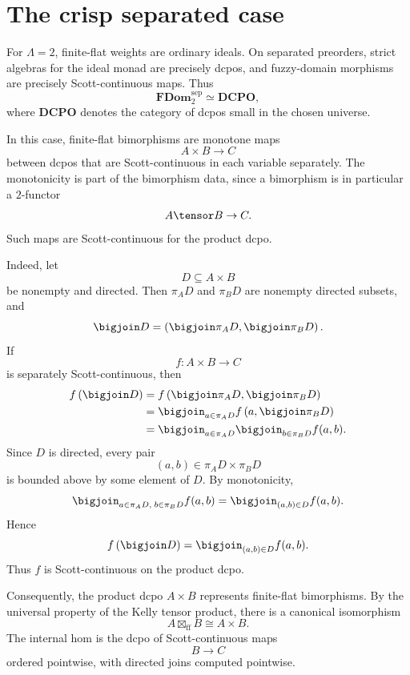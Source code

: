 \section{The crisp separated case}
\label{sec:crisp-separated-case-fdom-rewrite}

For \(\Lambda=2\), finite-flat weights are ordinary ideals.  On separated
preorders, strict algebras for the ideal monad are precisely dcpos, and
fuzzy-domain morphisms are precisely Scott-continuous maps.  Thus
\[
    \mathbf{FDom}_{2}^{\mathrm{sep}}
    \simeq
    \mathbf{DCPO},
\]
where \(\mathbf{DCPO}\) denotes the category of dcpos small in the chosen
universe.

In this case, finite-flat bimorphisms are monotone maps
\[
    A\times B\to C
\]
between dcpos that are Scott-continuous in each variable separately.  The
monotonicity is part of the bimorphism data, since a bimorphism is in particular
a \(2\)-functor
\[
    A\tensor B\to C.
\]
Such maps are Scott-continuous for the product dcpo.

Indeed, let
\[
    D\subseteq A\times B
\]
be nonempty and directed.  Then \(\pi_A D\) and \(\pi_BD\) are nonempty directed
subsets, and
\[
    \bigjoin D
    =
    \left(
        \bigjoin\pi_A D,
        \bigjoin\pi_BD
    \right).
\]
If
\[
    f:A\times B\to C
\]
is separately Scott-continuous, then
\[
\begin{aligned}
    f\left(\bigjoin D\right)
    &=
    f\left(
        \bigjoin\pi_A D,
        \bigjoin\pi_B D
    \right)
    \\
    &=
    \bigjoin_{a\in\pi_A D}
        f\left(a,\bigjoin\pi_BD\right)
    \\
    &=
    \bigjoin_{a\in\pi_A D}
        \bigjoin_{b\in\pi_BD}
            f(a,b).
\end{aligned}
\]
Since \(D\) is directed, every pair
\[
    (a,b)\in\pi_A D\times\pi_BD
\]
is bounded above by some element of \(D\).  By monotonicity,
\[
    \bigjoin_{a\in\pi_A D,\;b\in\pi_BD}f(a,b)
    =
    \bigjoin_{(a,b)\in D}f(a,b).
\]
Hence
\[
    f\left(\bigjoin D\right)
    =
    \bigjoin_{(a,b)\in D}f(a,b).
\]
Thus \(f\) is Scott-continuous on the product dcpo.

Consequently, the product dcpo \(A\times B\) represents finite-flat bimorphisms.
By the universal property of the Kelly tensor product, there is a canonical
isomorphism
\[
    A\boxtimes_{\mathrm{ff}}B
    \cong
    A\times B.
\]
The internal hom is the dcpo of Scott-continuous maps
\[
    B\to C
\]
ordered pointwise, with directed joins computed pointwise.

